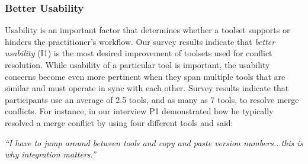 
\subsubsection{Better Usability}
Usability is an important factor that determines whether a toolset supports or hinders the practitioner's workflow.
Our survey results indicate that \textit{better usability} (I1) is the most desired improvement of toolsets used for conflict resolution. 
While usability of a particular tool is important, the usability concerns become even more pertinent when they span multiple tools that are similar and must operate in sync with each other.
Survey results indicate that participants use an average of 2.5 tools, and as many as 7 tools, to resolve merge conflicts.
For instance, in our interview P1 demonstrated how he typically resolved a merge conflict by using four different tools and said: 
\begin{quoting}
\textit{``I have to jump around between tools and copy and paste version numbers...this is why integration matters.''}
\end{quoting}


